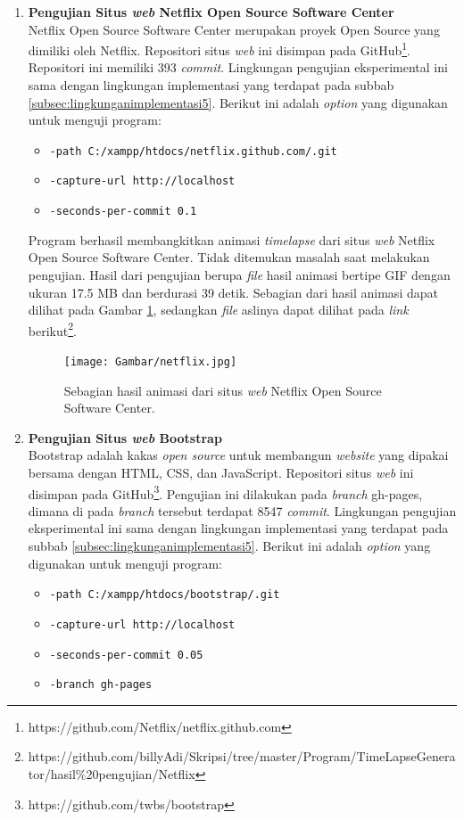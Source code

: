 \begin{enumerate}
\item \textbf{Pengujian Situs \textit{web} Netflix Open Source Software Center}\\
Netflix Open Source Software Center merupakan proyek Open Source yang dimiliki oleh Netflix. Repositori situs \textit{web} ini disimpan pada GitHub\footnote{https://github.com/Netflix/netflix.github.com}. Repositori ini memiliki 393 \textit{commit}. Lingkungan pengujian eksperimental ini sama dengan lingkungan implementasi yang terdapat pada subbab \ref{subsec:lingkunganimplementasi5}. Berikut ini adalah \textit{option} yang digunakan untuk menguji program:
\begin{itemize}
\item \texttt{-path C:/xampp/htdocs/netflix.github.com/.git}
\item \texttt{-capture-url http://localhost}
\item \texttt{-seconds-per-commit 0.1} 
\end{itemize}
Program berhasil membangkitkan animasi \textit{timelapse} dari situs \textit{web} Netflix Open Source Software Center. Tidak ditemukan masalah saat melakukan pengujian. Hasil dari pengujian berupa \textit{file} hasil animasi bertipe GIF dengan ukuran 17.5 MB dan berdurasi 39 detik. Sebagian dari hasil animasi dapat dilihat pada Gambar \ref{fig:hasil_netflix}, sedangkan \textit{file} aslinya dapat dilihat pada \textit{link} berikut\footnote{https://github.com/billyAdi/Skripsi/tree/master/Program/TimeLapseGenerator/hasil\%20pengujian/Netflix}.




\begin{figure}[H]	
		\texttt{[image: Gambar/netflix.jpg]}
	\caption{Sebagian hasil animasi dari situs \textit{web} Netflix Open Source Software Center.}
	\label{fig:hasil_netflix}
\end{figure}



\item \textbf{Pengujian Situs \textit{web} Bootstrap}\\
Bootstrap adalah kakas \textit{open source} untuk membangun \textit{website} yang dipakai bersama dengan HTML, CSS, dan JavaScript. Repositori situs \textit{web} ini disimpan pada GitHub\footnote{https://github.com/twbs/bootstrap}. Pengujian ini dilakukan pada \textit{branch} gh-pages, dimana di pada \textit{branch} tersebut terdapat 8547 \textit{commit}. Lingkungan pengujian eksperimental ini sama dengan lingkungan implementasi yang terdapat pada subbab \ref{subsec:lingkunganimplementasi5}. 
Berikut ini adalah \textit{option} yang digunakan untuk menguji program:
\begin{itemize}
\item \texttt{-path C:/xampp/htdocs/bootstrap/.git}
\item \texttt{-capture-url http://localhost}
\item \texttt{-seconds-per-commit 0.05} 
\item \texttt{-branch gh-pages}
\end{itemize}


\end{enumerate}
